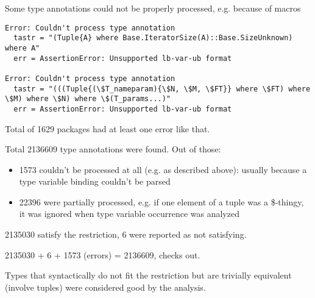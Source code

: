 Some type annotations could not be properly processed, e.g. because of macros
\begin{verbatim}
Error: Couldn't process type annotation
  tastr = "(Tuple{A} where Base.IteratorSize(A)::Base.SizeUnknown) where A"
  err = AssertionError: Unsupported lb-var-ub format

Error: Couldn't process type annotation
  tastr = "(((Tuple{(\$T_nameparam){\$N, \$M, \$FT}} where \$FT) where \$M) where \$N) where \$(T_params...)"
  err = AssertionError: Unsupported lb-var-ub format
\end{verbatim}
Total of 1629 packages had at least one error like that.

Total 2136609 type annotations were found. Out of those:
\begin{itemize}
    \item 1573 couldn't be processed at all (e.g. as described above): usually
        because a type variable binding couldn't be parsed
    \item 22396 were partially processed, e.g. if one element of a tuple was
        a \$-thingy, it was ignored when type variable occurrence was analyzed
\end{itemize}

2135030 satisfy the restriction, 6 were reported as not satisfying.

2135030 + 6 + 1573 (errors) = 2136609, checks out.

Types that syntactically do not fit the restriction but are trivially
equivalent (involve tuples) were considered good by the analysis.
